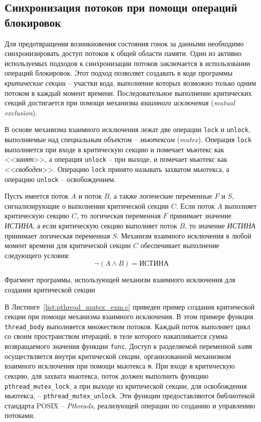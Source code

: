 \subsection{Синхронизация потоков при помощи операций блокировок}
Для предотвращения возникновения состояния гонок за данными необходимо синхронизировать доступ потоков к общей области памяти. Один из активно используемых подходов к синхронизации потоков заключается в использовании операций блокировок. Этот подход позволяет создавать в коде программы \textit{критические секции} -- участки кода, выполнение которых возможно только одним потоком в каждый момент времени. Последовательное выполнение критических секций достигается при помощи механизма \textit{взаимного исключения} (\textit{mutual exclusion}).

В основе механизма взаимного исключения лежат две операции \texttt{lock} и \texttt{unlock}, выполняемые над специальным объектом -- \textit{мьютексом} (\textit{mutex}). Операция \texttt{lock} выполняется при входе в критическую секцию и помечает мьютекс как <<\textit{занят}>>, а операция \texttt{unlock} -- при выходе, и помечает мьютекс как <<\textit{свободен}>>. Операцию \texttt{lock} принято называть захватом мьютекса, а операцию \texttt{unlock} -- освобождением.

Пусть имеется поток $A$ и поток $B$, а также логические переменные $F$ и $S$, сигнализирующие о выполнении критической секции $C$. Если поток $A$ выполняет критическую секцию $C$, то логическая переменная $F$ принимает значение \textit{ИСТИНА}, а если критическую секцию выполняет поток $B$, то значение \textit{ИСТИНА} принимает логическая переменная $S$. Механизм взаимного исключения в любой момент времени для критической секции $C$ обеспечивает выполнение следующего условия:
\begin{equation}
  \label{eq:mutex_condition}
  \neg(A \land B) = \textit{ИСТИНА}
\end{equation}

\begin{ListingEnv}[!h]
	
    \caption{Фрагмент программы, использующей механизм взаимного исключения для создания критической секции}
    \label{list:pthread_mutex_exm.c}
\end{ListingEnv}

В Листинге~\ref{list:pthread_mutex_exm.c} приведен пример создания критической секции при помощи механизма взаимного исключения. В этом примере функция \texttt{thread\_body} выполняется множеством потоков. Каждый поток выполняет цикл со своим пространством итераций, в теле которого накапливается сумма возвращаемого значения функции \texttt{func}. Доступ к разделяемой переменной \texttt{summ} осуществляется внутри критической секции, организованной механизмом взаимного исключения при помощи мьютекса \texttt{m}. При входе в критическую секцию, для захвата мьютекса, поток должен выполнить функцию \texttt{pthread\_mutex\_lock}, а при выходе из критической секции, для освобождения мьютекса, -- \texttt{pthread\_mutex\_unlock}. Эти функции предоставляются библиотекой стандарта POSIX -- \textit{Pthreads}, реализующей операции по созданию и управлению потоками.

